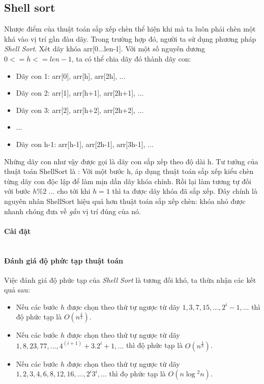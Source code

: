 \documentclass[8pt, a4paper]{article}
\newcommand{\mnt}[1]{\inputminted[frame=single, linenos=true, tabsize=4]{c++}{#1}}
\begin{document}
\subsection{Shell sort}

Nhược điểm của thuật toán sắp xếp chèn thể hiện khi mà ta luôn phải chèn một khá vào vị trí gần đàu dãy. Trong trường hợp đó, người ta sử dụng phương pháp \emph{Shell Sort}. Xét dãy khóa arr[0...len-1]. Với một số nguyên dương $0 <= h <= len-1$, ta có thể chia dãy đó thành dãy con:
\begin{itemize}
\item Dãy con 1: arr[0], arr[h], arr[2h], ...
\item Dãy con 2: arr[1], arr[h+1], arr[2h+1], ...
\item Dãy con 3: arr[2], arr[h+2], arr[2h+2], ...
\item ...
\item Dãy con h-1: arr[h-1], arr[2h-1], arr[3h-1], ...
\end{itemize}

Những dãy con như vậy được gọi là dãy con sắp xếp theo độ dài h. Tư tưởng của thuật toán ShellSort là : Với một bước h, áp dụng thuật toán sắp xếp kiểu chèn từng dãy con độc lập để làm mịn dần dãy khóa chính. Rồi lại làm tương tự đối với bước $h \% 2$ ... cho tới khi $h = 1$ thì ta được dãy khóa đã sắp xếp.
Đây chính là nguyên nhân ShellSort hiệu quả hơn thuật toán sắp xếp chèn: khóa nhỏ được nhanh chóng đưa về \emph{gần} vị trí đúng của nó.

\paragraph{Cài đặt}
\mnt{src/shellsort.cpp}

\paragraph{Đánh giá độ phức tạp thuật toán}

Việc đánh giá độ phức tạp của \emph{Shell Sort} là tương đối khó, ta thừa nhận các kết quả sau:

\begin{itemize} 
\item Nếu các bước $h$ được chọn theo thứ tự ngược từ dãy $1, 3, 7, 15, ..., 2^i-1, ...$ thì độ phức tạp là $O(n^\frac{3}{2})$.
\item Nếu các bước $h$ được chọn theo thứ tự ngược từ dãy $1, 8, 23, 77, ..., 4^(i+1)+3.2^i + 1, ...$ thì độ phức tạp là $O(n^\frac{4}{3})$.
\item Nếu các bước $h$ được chọn theo thứ tự ngược từ dãy $1, 2, 3, 4, 6, 8, 12, 16, ..., 2^i 3^i, ...$ thì đọ phức tạp là $O(n\log{}^2n)$.
\end{itemize}
\end{document}

